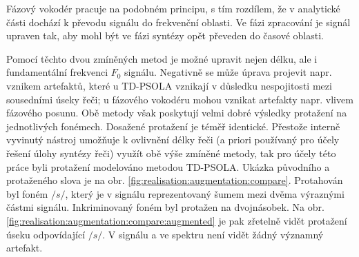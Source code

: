 Fázový vokodér pracuje na podobném principu, s tím rozdílem, že v analytické části dochází k převodu signálu do frekvenční oblasti.
Ve fázi zpracování je signál upraven tak, aby mohl být ve fázi syntézy opět převeden do časové oblasti.

Pomocí těchto dvou zmíněných metod je možné upravit nejen délku, ale i  fundamentální frekvenci $F_0$ signálu.
Negativně se může úprava projevit napr. vznikem artefaktů, které u TD-PSOLA vznikají v důsledku nespojitosti mezi sousedními úseky řeči; u fázového vokodéru mohou vznikat artefakty napr. vlivem fázového posunu.
Obě metody však poskytují velmi dobré výsledky protažení na jednotlivých fonémech.
Dosažené protažení je téměř identické.
Přestože interně vyvinutý nástroj umožňuje k ovlivnění délky řeči (a priori používaný pro účely řešení úlohy syntézy řeči) využít obě výše zmíněné metody, tak pro účely této práce byli protažení modelováno metodou TD-PSOLA.
Ukázka původního a protaženého slova  je na obr. \ref{fig:realisation:augmentation:compare}.
Protahován byl foném $/s/$, který je v signálu reprezentovaný šumem mezi dvěma výraznými částmi signálu.
Inkriminovaný foném byl protažen na dvojnásobek.
Na obr. \ref{fig:realisation:augmentation:compare:augmented} je pak zřetelně vidět protažení úseku odpovídající $/s/$.
V signálu a ve spektru není vidět žádný významný artefakt.

